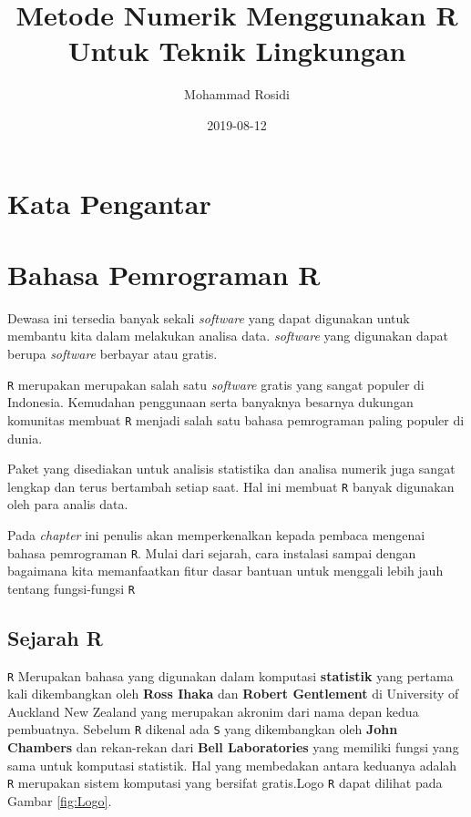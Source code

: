 \documentclass[]{book}
\title{Metode Numerik Menggunakan R Untuk Teknik Lingkungan}
\author{Mohammad Rosidi}
\date{2019-08-12}
\theoremstyle{definition}
\theoremstyle{definition}
\theoremstyle{definition}
\theoremstyle{remark}
\begin{document}
\maketitle

{
\setcounter{tocdepth}{1}
\tableofcontents
}
\hypertarget{kata-pengantar}{%
\chapter*{Kata Pengantar}\label{kata-pengantar}}

\hypertarget{intro}{%
\chapter{Bahasa Pemrograman R}\label{intro}}

Dewasa ini tersedia banyak sekali \emph{software} yang dapat digunakan untuk membantu kita dalam melakukan analisa data. \emph{software} yang digunakan dapat berupa \emph{software} berbayar atau gratis.

\texttt{R} merupakan merupakan salah satu \emph{software} gratis yang sangat populer di Indonesia. Kemudahan penggunaan serta banyaknya besarnya dukungan komunitas membuat \texttt{R} menjadi salah satu bahasa pemrograman paling populer di dunia.

Paket yang disediakan untuk analisis statistika dan analisa numerik juga sangat lengkap dan terus bertambah setiap saat. Hal ini membuat \texttt{R} banyak digunakan oleh para analis data.

Pada \emph{chapter} ini penulis akan memperkenalkan kepada pembaca mengenai bahasa pemrograman \texttt{R}. Mulai dari sejarah, cara instalasi sampai dengan bagaimana kita memanfaatkan fitur dasar bantuan untuk menggali lebih jauh tentang fungsi-fungsi \texttt{R}

\hypertarget{sejarahR}{%
\section{Sejarah R}\label{sejarahR}}

\texttt{R} Merupakan bahasa yang digunakan dalam komputasi \textbf{statistik} yang pertama kali dikembangkan oleh \textbf{Ross Ihaka} dan \textbf{Robert Gentlement} di University of Auckland New Zealand yang merupakan akronim dari nama depan kedua pembuatnya. Sebelum \texttt{R} dikenal ada \texttt{S} yang dikembangkan oleh \textbf{John Chambers} dan rekan-rekan dari \textbf{Bell Laboratories} yang memiliki fungsi yang sama untuk komputasi statistik. Hal yang membedakan antara keduanya adalah \texttt{R} merupakan sistem komputasi yang bersifat gratis.Logo \texttt{R} dapat dilihat pada Gambar \ref{fig:Logo}.
\end{document}
